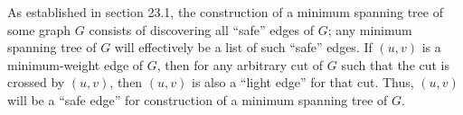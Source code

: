 As established in section 23.1, the construction of a minimum spanning tree of some graph $ G $ consists of discovering all ``safe'' edges of $ G $; any minimum spanning tree of $ G $ will effectively be a list of such ``safe'' edges. If  $ (u,v) $ is a minimum-weight edge of $ G $, then for any arbitrary cut of $ G $ such that the cut is crossed by $ (u,v) $, then $ (u,v) $ is also a ``light edge'' for that cut. Thus, $ (u,v) $ will be a ``safe edge'' for construction of a minimum spanning tree of $ G $.